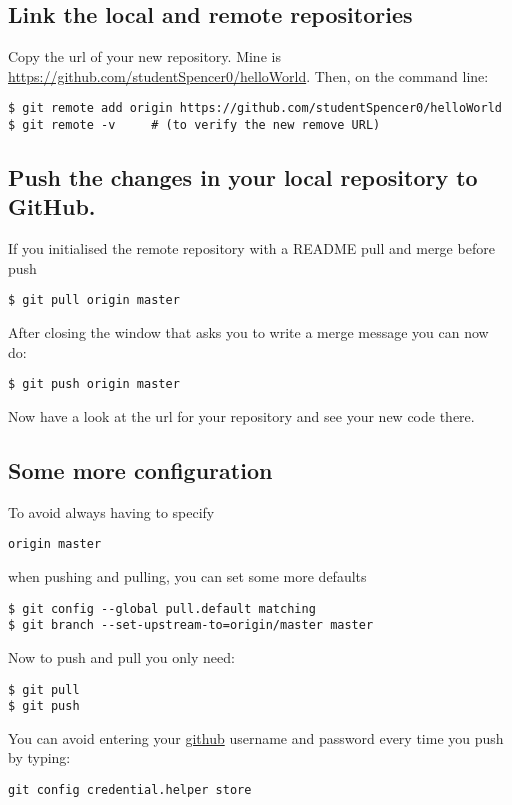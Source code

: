 \subsection{Link the local and remote repositories}

Copy the url of your new repository. Mine is \url{https://github.com/studentSpencer0/helloWorld}.
Then, on the command line:
\begin{lstlisting}
$ git remote add origin https://github.com/studentSpencer0/helloWorld
$ git remote -v     # (to verify the new remove URL)
\end{lstlisting}
\pause 

\subsection{Push the changes in your local repository to GitHub.}

If you initialised the remote repository with a README pull and merge
before push
\begin{lstlisting}
$ git pull origin master
\end{lstlisting}
After closing the window that asks you to write a merge message you
can now do:

\begin{lstlisting}
$ git push origin master
\end{lstlisting}
 Now have a look at the url for your repository and see your new code
there.

\clearpage{}

\subsection{Some more configuration}

To avoid always having to specify
\begin{lstlisting}
origin master
\end{lstlisting}
when pushing and pulling, you can set some more defaults
\begin{lstlisting}
$ git config --global pull.default matching
$ git branch --set-upstream-to=origin/master master
\end{lstlisting}
Now to push and pull you only need:
\begin{lstlisting}
$ git pull
$ git push
\end{lstlisting}
You can avoid entering your \url{github} username and password every
time you push by typing:
\begin{lstlisting}
git config credential.helper store
\end{lstlisting}
\pause 

